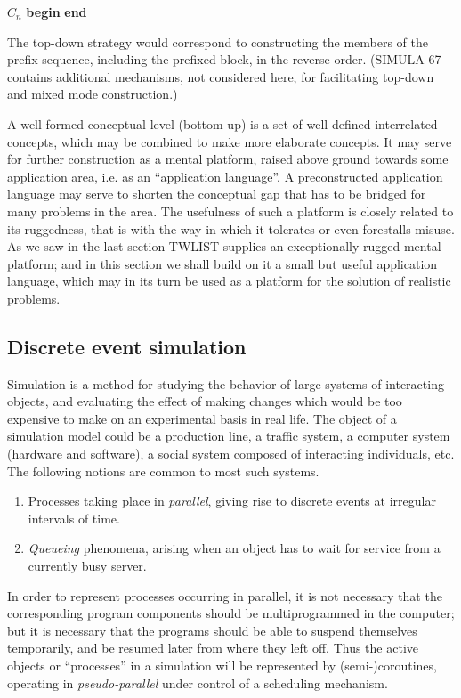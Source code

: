\quad $C_n$ \textbf{begin} \textemdash{} \textbf{end}

\noindent
The top-down strategy would correspond to constructing the members of the prefix sequence, including the prefixed block, in the reverse order. (SIMULA 67 contains additional mechanisms, not considered here, for facilitating top-down and mixed mode construction.)

A well-formed conceptual level (bottom-up) is a set of well-defined interrelated concepts, which may be combined to make more elaborate concepts. It may serve for further construction as a mental platform, raised above ground towards some application area, i.e. as an ``application language''. A preconstructed application language may serve to shorten the conceptual gap that has to be bridged for many problems in the area. The usefulness of such a platform is closely related to its ruggedness, that is with the way in which it tolerates or even forestalls misuse. As we saw in the last section TWLIST supplies an exceptionally rugged mental platform; and in this section we shall build on it a small but useful application language, which may in its turn be used as a platform for the solution of realistic problems.

\subsection{Discrete event simulation}

Simulation is a method for studying the behavior of large systems of interacting objects, and evaluating the effect of making changes which would be too expensive to make on an experimental basis in real life. The object of a simulation model could be a production line, a traffic system, a computer system (hardware and software), a social system composed of interacting individuals, etc. The following notions are common to most such systems.

\begin{enumerate}[wide, nosep, label=(\arabic*)]
	\item Processes taking place in \textit{parallel}, giving rise to discrete events at irregular intervals of time.
	\item \textit{Queueing} phenomena, arising when an object has to wait for service from a currently busy server.
\end{enumerate}

In order to represent processes occurring in parallel, it is not necessary that the corresponding program components should be multiprogrammed in the computer; but it is necessary that the programs should be able to suspend themselves temporarily, and be resumed later from where they left off. Thus the active objects or ``processes'' in a simulation will be represented by (semi-)coroutines, operating in \textit{pseudo-parallel} under control of a scheduling mechanism.

